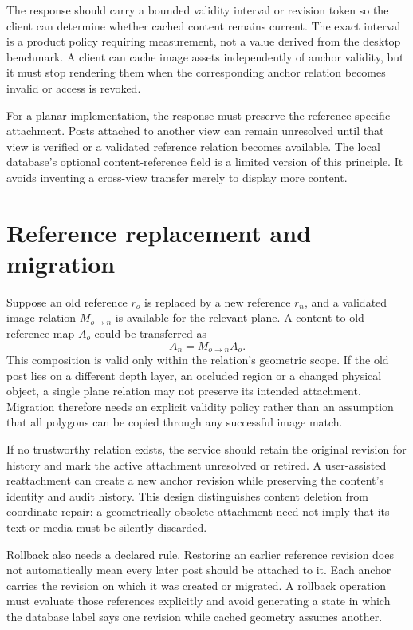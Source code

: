 The response should carry a bounded validity interval or revision token so the client can determine whether cached content remains current. The exact interval is a product policy requiring measurement, not a value derived from the desktop benchmark. A client can cache image assets independently of anchor validity, but it must stop rendering them when the corresponding anchor relation becomes invalid or access is revoked.

For a planar implementation, the response must preserve the reference-specific attachment. Posts attached to another view can remain unresolved until that view is verified or a validated reference relation becomes available. The local database's optional content-reference field is a limited version of this principle. It avoids inventing a cross-view transfer merely to display more content.

\section{Reference replacement and migration}
Suppose an old reference $r_o$ is replaced by a new reference $r_n$, and a validated image relation $M_{o\rightarrow n}$ is available for the relevant plane. A content-to-old-reference map $A_o$ could be transferred as
\begin{equation}
 A_n=M_{o\rightarrow n}A_o.
\end{equation}
This composition is valid only within the relation's geometric scope. If the old post lies on a different depth layer, an occluded region or a changed physical object, a single plane relation may not preserve its intended attachment. Migration therefore needs an explicit validity policy rather than an assumption that all polygons can be copied through any successful image match.

If no trustworthy relation exists, the service should retain the original revision for history and mark the active attachment unresolved or retired. A user-assisted reattachment can create a new anchor revision while preserving the content's identity and audit history. This design distinguishes content deletion from coordinate repair: a geometrically obsolete attachment need not imply that its text or media must be silently discarded.

Rollback also needs a declared rule. Restoring an earlier reference revision does not automatically mean every later post should be attached to it. Each anchor carries the revision on which it was created or migrated. A rollback operation must evaluate those references explicitly and avoid generating a state in which the database label says one revision while cached geometry assumes another.

